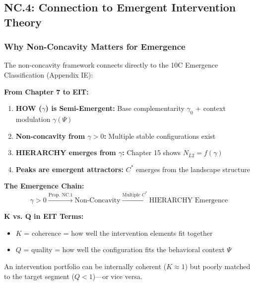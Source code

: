 
\subsection{NC.4: Connection to Emergent Intervention Theory}
\label{sec:nc-eit}

\subsubsection{Why Non-Concavity Matters for Emergence}

The non-concavity framework connects directly to the 10C Emergence Classification (Appendix IE):

\begin{tcolorbox}[colback=green!5!white, colframe=green!75!black,
    title=\textbf{Connection to EIT: How $\gamma$ Creates Emergence}]

\textbf{From Chapter 7 to EIT:}
\begin{enumerate}
\item \textbf{HOW ($\gamma$) is Semi-Emergent:} Base complementarity $\gamma_0$ + context modulation $\gamma(\Psi)$
\item \textbf{Non-concavity from $\gamma > 0$:} Multiple stable configurations exist
\item \textbf{HIERARCHY emerges from $\gamma$:} Chapter 15 shows $N_{L2} = f(\gamma)$
\item \textbf{Peaks are emergent attractors:} $C^*$ emerges from the landscape structure
\end{enumerate}

\textbf{The Emergence Chain:}
\begin{equation}
\gamma > 0 \xrightarrow{\text{Prop. NC.1}} \text{Non-Concavity} \xrightarrow{\text{Multiple } C^*} \text{HIERARCHY Emergence}
\end{equation}

\textbf{K vs. Q in EIT Terms:}
\begin{itemize}
\item $K$ = coherence = how well the intervention elements fit together
\item $Q$ = quality = how well the configuration fits the behavioral context $\Psi$
\end{itemize}

An intervention portfolio can be internally coherent ($K \approx 1$) but poorly matched to the target segment ($Q < 1$)---or vice versa.
\end{tcolorbox}

